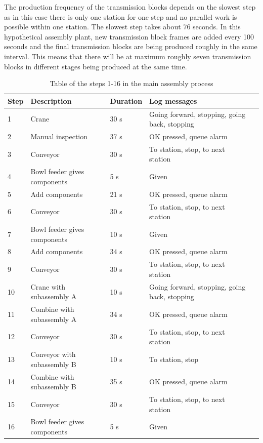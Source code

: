 \documentclass[journal]{IEEEtran}
\begin{document}
The production frequency of the transmission blocks depends on the slowest step as in this case there is only one station for one step and no
parallel work is possible within one station. The slowest step takes about 76 seconds. In this hypothetical assembly plant, new transmission block
frames are added every 100 seconds and the final transmission blocks are being produced roughly in the same interval. This means that there
will be at maximum roughly seven transmission blocks in different stages being produced at the same time.

\begin{table}[!t]
\renewcommand{\arraystretch}{1.3}
\caption{Table of the steps 1-16 in the main assembly process}
\label{mainsteps1}
\centering
\begin{tabular}{|p{5mm}|p{20mm}|p{10mm}|p{15mm}|p{15mm}|}
\hline
Step & Description & Duration & Log messages \\
\hline
\hline
1 & Crane & 30 s & Going forward, stopping, going back, stopping \\
\hline
2 & Manual inspection & 37 s & OK pressed, queue alarm \\
\hline
3 & Conveyor & 30 s & To station, stop, to next station \\
\hline
4 & Bowl feeder gives components & 5 s & Given \\
\hline
5 & Add components & 21 s & OK pressed, queue alarm \\
\hline
6 & Conveyor & 30 s & To station, stop, to next station \\
\hline
7 & Bowl feeder gives components & 10 s & Given \\
\hline
8 & Add components & 34 s & OK pressed, queue alarm \\
\hline
9 & Conveyor & 30 s & To station, stop, to next station \\
\hline
10 & Crane with subassembly A & 10 s & Going forward, stopping, going back, stopping \\
\hline
11 & Combine with subassembly A & 34 s & OK pressed, queue alarm \\
\hline
12 & Conveyor & 30 s & To station, stop, to next station \\
\hline
13 & Conveyor with subassembly B & 10 s & To station, stop \\
\hline
14 & Combine with subassembly B & 35 s & OK pressed, queue alarm \\
\hline
15 & Conveyor & 30 s & To station, stop, to next station \\
\hline
16 & Bowl feeder gives components & 5 s & Given \\
\hline
\end{tabular}
\end{table}
\end{document}
